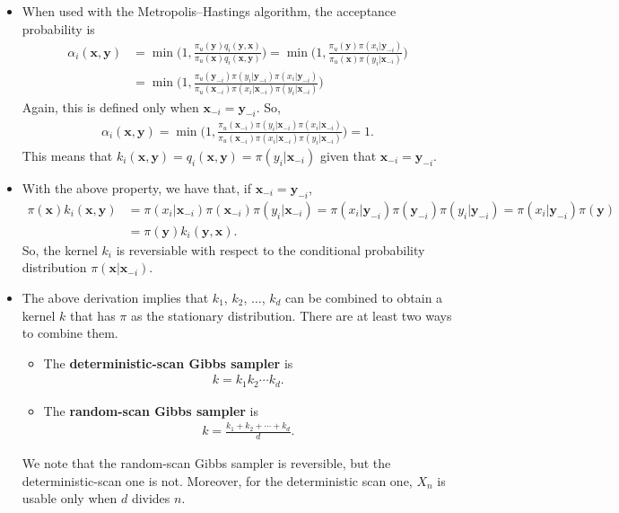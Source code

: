 \documentclass[10pt]{article}
\newcommand{\ve}[1]{\mathbf{#1}}
\begin{document}
\begin{itemize}
  \item When used with the Metropolis--Hastings algorithm, the acceptance probability is
  \begin{align*}
    \alpha_i(\ve{x}, \ve{y}) 
    &= \min\bigg( 1, \frac{\pi_u(\ve{y}) q_i(\ve{y},\ve{x}) }{\pi_u(\ve{x})q_i(\ve{x},\ve{y}) } \bigg)
    = \min\bigg( 1, \frac{\pi_u(\ve{y}) \pi(x_i|\ve{y}_{-i}) }{\pi_u(\ve{x}) \pi(y_i|\ve{x}_{-i}) } \bigg) \\
    &= \min\bigg( 1, \frac{\pi_u(\ve{y}_{-i}) \pi(y_i|\ve{y}_{-i}) \pi(x_i|\ve{y}_{-i}) }{ \pi_u(\ve{x}_{-i}) \pi(x_i|\ve{x}_{-i}) \pi(y_i|\ve{x}_{-i}) } \bigg)
  \end{align*}
  Again, this is defined only when $\ve{x}_{-i} = \ve{y}_{-i}$. So,
  \begin{align*}
    \alpha_i(\ve{x}, \ve{y}) 
    = \min\bigg( 1, \frac{\pi_u(\ve{x}_{-i}) \pi(y_i|\ve{x}_{-i}) \pi(x_i|\ve{x}_{-i}) }{ \pi_u(\ve{x}_{-i}) \pi(x_i|\ve{x}_{-i}) \pi(y_i|\ve{x}_{-i}) } \bigg)
    = 1.
  \end{align*}
  This means that $k_i(\ve{x},\ve{y}) = q_i(\ve{x},\ve{y}) = \pi(y_i|\ve{x}_{-i})$ given that $\ve{x}_{-i} = \ve{y}_{-i}$.

  \item With the above property, we have that, if $\ve{x}_{-i} = \ve{y}_{-i}$, 
  \begin{align*}
    \pi(\ve{x}) k_i(\ve{x},\ve{y}) 
    &= \pi(x_i|\ve{x}_{-i}) \pi(\ve{x}_{-i}) \pi(y_i|\ve{x}_{-i}) 
    = \pi(x_i|\ve{y}_{-i}) \pi(\ve{y}_{-i}) \pi(y_i|\ve{y}_{-i})
    = \pi(x_i|\ve{y}_{-i}) \pi(\ve{y}) \\
    &= \pi(\ve{y}) k_i(\ve{y},\ve{x}).
  \end{align*}
  So, the kernel $k_i$ is reversiable with respect to the conditional probability distribution $\pi(\ve{x}|\ve{x}_{-i})$.
  
  \item The above derivation implies that $k_1$, $k_2$, $\dotsc$, $k_d$ can be combined to obtain a kernel $k$ that has $\pi$ as the stationary distribution. There are at least two ways to combine them.
  \begin{itemize}
    \item The {\bf deterministic-scan Gibbs sampler} is
    \begin{align*}
      k = k_1 k_2 \dotsm k_d.
    \end{align*} 

    \item The {\bf random-scan Gibbs sampler} is
    \begin{align*}
      k = \frac{k_1 + k_2 + \dotsb + k_d}{d}.
    \end{align*}
  \end{itemize}
  We note that the random-scan Gibbs sampler is reversible, but the deterministic-scan one is not. Moreover, for the deterministic scan one, $X_n$ is usable only when $d$ divides $n$.
\end{itemize}
\end{document}
